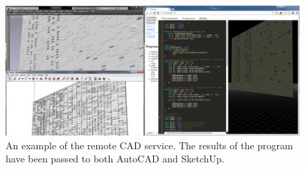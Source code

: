 \begin{figure}
  \centering
  \includegraphics[width=1.0\textwidth]{./images/remote_cad_example/remote_cad_example}
  \caption[An example of the remote CAD service.]{An example of the remote CAD service. The results of the program have been passed to both AutoCAD and SketchUp.}
  \label{fig:remote:cad:example}
\end{figure}






